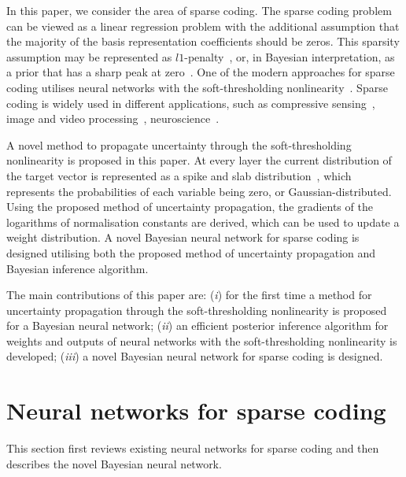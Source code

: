 \documentclass{article}
\begin{document}
  In this paper, we consider the area of sparse coding. The sparse coding problem can be viewed as a linear regression problem with the additional assumption that the majority of the basis representation coefficients should be zeros. This sparsity assumption may be represented as $l1$-penalty~\cite{tibshirani1996regression}, or, in Bayesian interpretation, as a prior that has a sharp peak at zero~\cite{tipping2001sparse}. One of the modern approaches for sparse coding utilises neural networks with the soft-thresholding nonlinearity~\cite{gregor2010learning, sprechmann2015learning}. Sparse coding is widely used in different applications, such as compressive sensing~\cite{candes2008introduction}, image and video processing~\cite{mairal2014sparse, wang2015deep}, neuroscience~\cite{baillet1997bayesian, jas2017learning}.

  A novel method to propagate uncertainty through the soft-thresholding nonlinearity is proposed in this paper. At every layer the current distribution of the target vector is represented as a spike and slab distribution~\cite{mitchell1988bayesian}, which represents the probabilities of each variable being zero, or Gaussian-distributed. Using the proposed method of uncertainty propagation, the gradients of the logarithms of normalisation constants are derived, which can be used to update a weight distribution. A novel Bayesian neural network for sparse coding is designed utilising both the proposed method of uncertainty propagation and Bayesian inference algorithm.

  The main contributions of this paper are: (\textit{i}) for the first time a method for uncertainty propagation through the soft-thresholding nonlinearity is proposed for a Bayesian neural network; (\textit{ii}) an efficient posterior inference algorithm for weights and outputs of neural networks with the soft-thresholding nonlinearity is developed; (\textit{iii}) a novel Bayesian neural network for sparse coding is designed.


\section{Neural networks for sparse coding}
  \label{sec:bayesian_lista}
  This section first reviews existing neural networks for sparse coding and then describes the novel Bayesian neural network.
  
\end{document}
